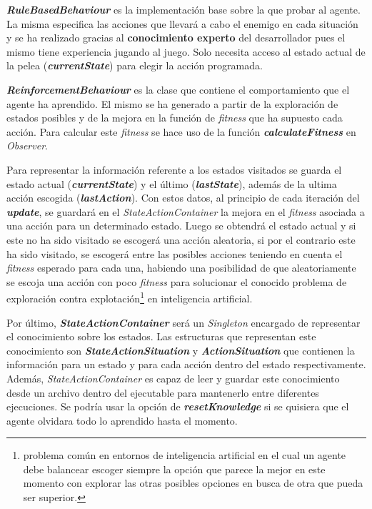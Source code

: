 \bigskip

\textbf{\textit{RuleBasedBehaviour}} es la implementación base sobre la que probar al agente. La misma especifica las acciones que llevará a cabo el enemigo en cada situación y se ha realizado gracias al \textbf{conocimiento experto} del desarrollador pues el mismo tiene experiencia jugando al juego. Solo necesita acceso al estado actual de la pelea (\textbf{\textit{currentState}}) para elegir la acción programada.

\bigskip

\textbf{\textit{ReinforcementBehaviour}} es la clase que contiene el comportamiento que el agente ha aprendido. El mismo se ha generado a partir de la exploración de estados posibles y de la mejora en la función de \textit{fitness} que ha supuesto cada acción. Para calcular este \textit{fitness} se hace uso de la función \textbf{\textit{calculateFitness}} en \textit{Observer}.

\bigskip

Para representar la información referente a los estados visitados se guarda el estado actual (\textbf{\textit{currentState}}) y el último (\textbf{\textit{lastState}}), además de la ultima acción escogida (\textbf{\textit{lastAction}}). Con estos datos, al principio de cada iteración del \textbf{\textit{update}}, se guardará en el \textit{StateActionContainer} la mejora en el \textit{fitness} asociada a una acción para un determinado estado. Luego se obtendrá el estado actual y si este no ha sido visitado se escogerá una acción aleatoria, si por el contrario este ha sido visitado, se escogerá entre las posibles acciones teniendo en cuenta el \textit{fitness} esperado para cada una, habiendo una posibilidad de que aleatoriamente se escoja una acción con poco \textit{fitness} para solucionar el conocido problema de exploración contra explotación\footnote{problema común en entornos de inteligencia artificial en el cual un agente debe balancear escoger siempre la opción que parece la mejor en este momento con explorar las otras posibles opciones en busca de otra que pueda ser superior.} en inteligencia artificial.

\bigskip

Por último, \textbf{\textit{StateActionContainer}} será un \textit{Singleton} encargado de representar el conocimiento sobre los estados. Las estructuras que representan este conocimiento son \textbf{\textit{StateActionSituation}} y \textbf{\textit{ActionSituation}} que contienen la información para un estado y para cada acción dentro del estado respectivamente. Además, \textit{StateActionContainer} es capaz de leer y guardar este conocimiento desde un archivo dentro del ejecutable para mantenerlo entre diferentes ejecuciones. Se podría usar la opción de \textbf{\textit{resetKnowledge}} si se quisiera que el agente olvidara todo lo aprendido hasta el momento.



